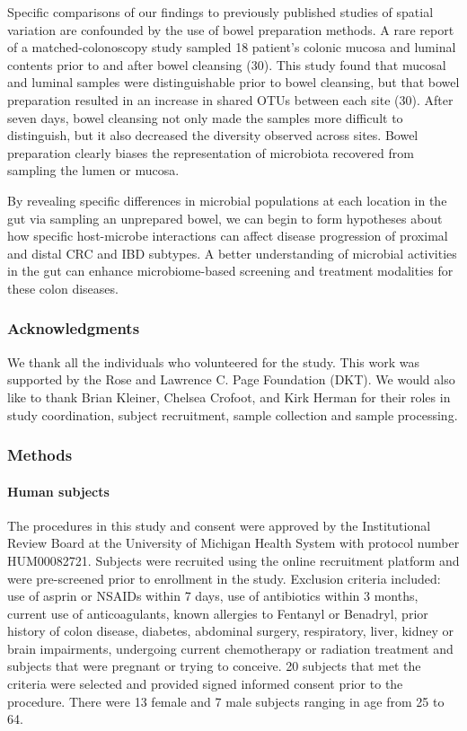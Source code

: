 \documentclass[12pt,]{article}
\let\oldparagraph\paragraph
\renewcommand{\paragraph}[1]{\oldparagraph{#1}\mbox{}}
\begin{document}
Specific comparisons of our findings to previously published studies of
spatial variation are confounded by the use of bowel preparation
methods. A rare report of a matched-colonoscopy study sampled 18
patient's colonic mucosa and luminal contents prior to and after bowel
cleansing (30). This study found that mucosal and luminal samples were
distinguishable prior to bowel cleansing, but that bowel preparation
resulted in an increase in shared OTUs between each site (30). After
seven days, bowel cleansing not only made the samples more difficult to
distinguish, but it also decreased the diversity observed across sites.
Bowel preparation clearly biases the representation of microbiota
recovered from sampling the lumen or mucosa.

By revealing specific differences in microbial populations at each
location in the gut via sampling an unprepared bowel, we can begin to
form hypotheses about how specific host-microbe interactions can affect
disease progression of proximal and distal CRC and IBD subtypes. A
better understanding of microbial activities in the gut can enhance
microbiome-based screening and treatment modalities for these colon
diseases.

\subsubsection{Acknowledgments}\label{acknowledgments}

We thank all the individuals who volunteered for the study. This work
was supported by the Rose and Lawrence C. Page Foundation (DKT). We
would also like to thank Brian Kleiner, Chelsea Crofoot, and Kirk Herman
for their roles in study coordination, subject recruitment, sample
collection and sample processing.

\subsubsection{Methods}\label{methods}

\paragraph{Human subjects}\label{human-subjects}

The procedures in this study and consent were approved by the
Institutional Review Board at the University of Michigan Health System
with protocol number HUM00082721. Subjects were recruited using the
online recruitment platform and were pre-screened prior to enrollment in
the study. Exclusion criteria included: use of asprin or NSAIDs within 7
days, use of antibiotics within 3 months, current use of anticoagulants,
known allergies to Fentanyl or Benadryl, prior history of colon disease,
diabetes, abdominal surgery, respiratory, liver, kidney or brain
impairments, undergoing current chemotherapy or radiation treatment and
subjects that were pregnant or trying to conceive. 20 subjects that met
the criteria were selected and provided signed informed consent prior to
the procedure. There were 13 female and 7 male subjects ranging in age
from 25 to 64.
\end{document}
